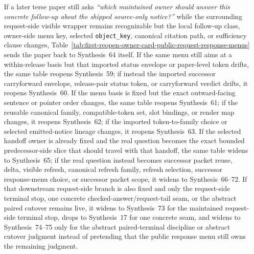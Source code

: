 \documentclass[11pt]{article}
\begin{document}
If a later terse paper still asks \emph{``which maintained owner should answer this concrete follow-up about the shipped source-only notice?''} while the surrounding request-side visible wrapper remains recognizable but the local follow-up class, owner-side menu key, selected \nolinkurl{object_key}, canonical citation path, or sufficiency clause changes, Table~\ref{tab:first-reopen-owner-card-public-request-response-menus} sends the paper back to Synthesis~64 itself. If the same menu still aims at a within-release basis but that imported status envelope or paper-level token drifts, the same table reopens Synthesis~59; if instead the imported successor carryforward envelope, release-pair status token, or carryforward verdict drifts, it reopens Synthesis~60. If the menu basis is fixed but the exact outward-facing sentence or pointer order changes, the same table reopens Synthesis~61; if the reusable canonical family, compatible-token set, slot bindings, or render map changes, it reopens Synthesis~62; if the imported token-to-family choice or selected emitted-notice lineage changes, it reopens Synthesis~63. If the selected handoff owner is already fixed and the real question becomes the exact bounded predecessor-side slice that should travel with that handoff, the same table widens to Synthesis~65; if the real question instead becomes successor packet reuse, delta, visible refresh, canonical refresh family, refresh selection, successor response-menu choice, or successor packet scope, it widens to Synthesis~66--72. If that downstream request-side branch is also fixed and only the request-side terminal stop, one concrete checked-answer/request-tail seam, or the abstract paired cutover remains live, it widens to Synthesis~73 for the maintained request-side terminal stop, drops to Synthesis~17 for one concrete seam, and widens to Synthesis~74--75 only for the abstract paired-terminal discipline or abstract cutover judgment instead of pretending that the public response menu still owns the remaining judgment.\cite{series:publicrequeststatusenvelopes,series:publicrequestcarryforward,series:publicrequestnotices,series:publicrequestnoticenormalforms,series:publicrequestnoticeselections,series:publicrequestresponsepackets,series:publicrequestresponsepacketcaryforward,series:publicrequestresponsepacketdeltaledgers,series:publicrequestresponsepacketrefreshnotices,series:publicrequestresponsepacketrefreshnoticenormalforms,series:publicrequestresponsepacketrefreshnoticeselections,series:publicrequestresponsepacketrefreshresponsemenus,series:publicrequestresponsepacketrefreshresponsepackets,series:publicrequestresponsepacketrefreshresponsepacketclosureverdicts,series:publicrequestresponsepacketrefreshresponsepacketclosureverdicts,series:pairedterminalcitationdiscipline,series:pairedterminalcutoverrules}
\end{document}
